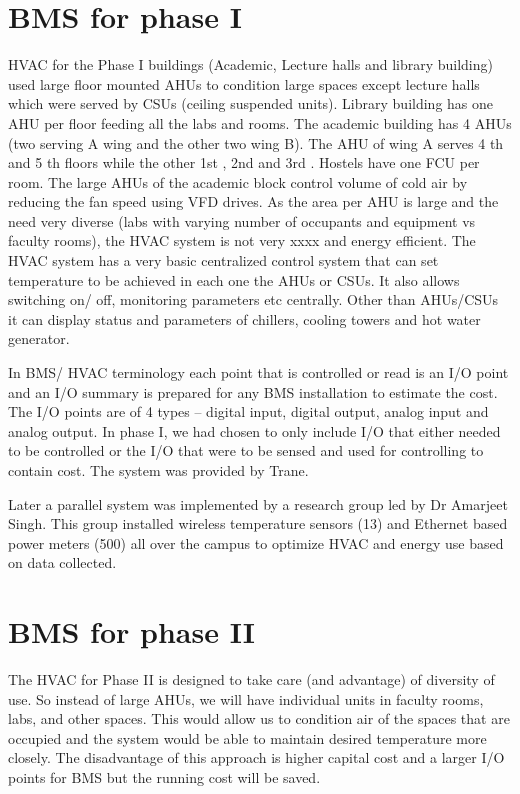 \documentclass[letterpaper,11pt]{report}
\begin{document}
\section{BMS for phase I}
HVAC for the Phase I buildings (Academic, Lecture halls and library building) used large floor mounted AHUs to condition large spaces except lecture halls which were served by CSUs (ceiling suspended units). Library building has one AHU per floor feeding all the labs and rooms. The academic building has 4 AHUs (two serving A wing and the other two wing B). The AHU of wing A serves 4 th and 5 th floors while the other 1st , 2nd and 3rd . Hostels have one FCU per room. The large AHUs of the academic block control volume of cold air by reducing the fan speed using VFD drives. As the area per AHU is large and the need very diverse (labs with varying number of occupants and equipment vs faculty rooms), the HVAC system is not very xxxx and energy efficient. The HVAC system has a very basic centralized control system that can set temperature to be achieved in each one the AHUs or CSUs. It also allows switching on/ off, monitoring parameters etc centrally. Other than AHUs/CSUs it can display status and parameters of chillers, cooling towers and hot water generator.
\par
In BMS/ HVAC terminology each point that is controlled or read is an I/O point and an I/O summary is prepared for any BMS installation to estimate the cost. The I/O points are of 4 types –  digital input, digital output, analog input and analog output. In phase I, we had chosen to only include I/O that either needed to be controlled or the I/O that were to be sensed and used for controlling to contain cost. The system was provided by Trane.
\par
Later a parallel system was implemented by a research group led by Dr Amarjeet Singh. This group installed wireless temperature sensors (13) and Ethernet based power meters (500) all over the campus to optimize HVAC and energy use based on data collected.
\pagebreak
\section{BMS for phase II}
The HVAC for Phase II is designed to take care (and advantage) of diversity of use. So instead of large AHUs, we will have individual units in faculty rooms, labs, and other spaces. This would allow us to condition air of the spaces that are occupied and the system would be able to maintain desired temperature more closely. The disadvantage of this approach is higher capital cost and a larger I/O points for BMS but the running cost will be saved.
\end{document}
